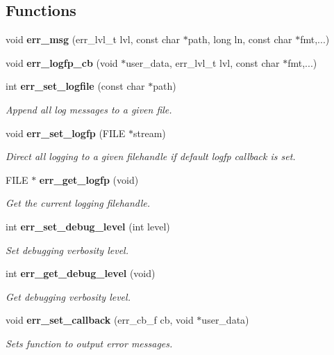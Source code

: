 \subsection*{Functions}
\begin{DoxyCompactItemize}
\item 
void {\bfseries err\-\_\-msg} (err\-\_\-lvl\-\_\-t lvl, const char $\ast$path, long ln, const char $\ast$fmt,...)\label{err_8c_a23fe928bb5db93f1d9c7a999f63211cc}

\item 
void {\bfseries err\-\_\-logfp\-\_\-cb} (void $\ast$user\-\_\-data, err\-\_\-lvl\-\_\-t lvl, const char $\ast$fmt,...)\label{err_8c_a6f045c44edb6a8d23718a21753d02ca6}

\item 
int {\bf err\-\_\-set\-\_\-logfile} (const char $\ast$path)
\begin{DoxyCompactList}\small\item\em Append all log messages to a given file. \end{DoxyCompactList}\item 
void {\bf err\-\_\-set\-\_\-logfp} (F\-I\-L\-E $\ast$stream)
\begin{DoxyCompactList}\small\item\em Direct all logging to a given filehandle if default logfp callback is set. \end{DoxyCompactList}\item 
F\-I\-L\-E $\ast$ {\bf err\-\_\-get\-\_\-logfp} (void)
\begin{DoxyCompactList}\small\item\em Get the current logging filehandle. \end{DoxyCompactList}\item 
int {\bf err\-\_\-set\-\_\-debug\-\_\-level} (int level)
\begin{DoxyCompactList}\small\item\em Set debugging verbosity level. \end{DoxyCompactList}\item 
int {\bf err\-\_\-get\-\_\-debug\-\_\-level} (void)
\begin{DoxyCompactList}\small\item\em Get debugging verbosity level. \end{DoxyCompactList}\item 
void {\bf err\-\_\-set\-\_\-callback} (err\-\_\-cb\-\_\-f cb, void $\ast$user\-\_\-data)
\begin{DoxyCompactList}\small\item\em Sets function to output error messages. \end{DoxyCompactList}\end{DoxyCompactItemize}


